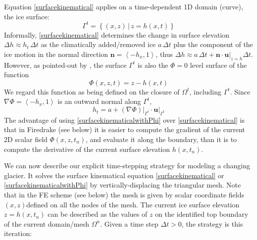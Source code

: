 \documentclass[letterpaper,final,12pt,reqno]{amsart}
\newcommand{\grad}{\nabla}
\newcommand{\bn}{\mathbf{n}}
\newcommand{\bu}{\mathbf{u}}
\begin{document}
Equation \eqref{surfacekinematical} applies on a time-dependent 1D domain (curve), the ice surface:
    $$\Gamma^t = \left\{(x,z) \,\big|\, z = h(x,t)\right\}$$
Informally, \eqref{surfacekinematical} determines the change in surface elevation $\Delta h \approx h_t\,\Delta t$ as the climatically added/removed ice $a\,\Delta t$ plus the component of the ice motion in the normal direction $\bn = \left<-h_x,1\right>$, thus $\Delta h \approx a \,\Delta t + \bn\cdot \bu\big|_{z=h} \Delta t$.  However, as pointed-out by \cite[pp.~65--66]{GreveBlatter2009}, the surface $\Gamma^t$ is also the $\Phi=0$ level surface of the function
    $$\Phi(x,z,t) = z - h(x,t)$$
We regard this function as being defined on the closure of $\Omega^t$, including $\Gamma^t$.  Since $\grad \Phi = \left<-h_x,1\right>$ is an outward normal along $\Gamma^t$,
\begin{equation}
h_t = a + (\grad \Phi)\big|_{\Gamma^t} \cdot \bu\big|_{\Gamma^t}  \label{surfacekinematicalwithPhi}
\end{equation}
The advantage of using \eqref{surfacekinematicalwithPhi} over \eqref{surfacekinematical} is that in Firedrake (see below) it is easier to compute the gradient of the current 2D scalar field $\Phi(x,z,t_n)$, and evaluate it along the boundary, than it is to compute the derivative of the current surface elevation $h(x,t_n)$.

We can now describe our explicit time-stepping strategy for modeling a changing glacier.  It solves the surface kinematical equation \eqref{surfacekinematical} or \eqref{surfacekinematicalwithPhi} by vertically-displacing the triangular mesh.  Note that in the FE scheme (see below) the mesh is given by scalar coordinate fields $(x,z)$defined on all the nodes of the mesh.  The current ice surface elevation $z=h(x,t_n)$ can be described as the values of $z$ on the identified top boundary of the current domain/mesh $\Omega^n$.  Given a time step $\Delta t > 0$, the strategy is this iteration:
\end{document}
